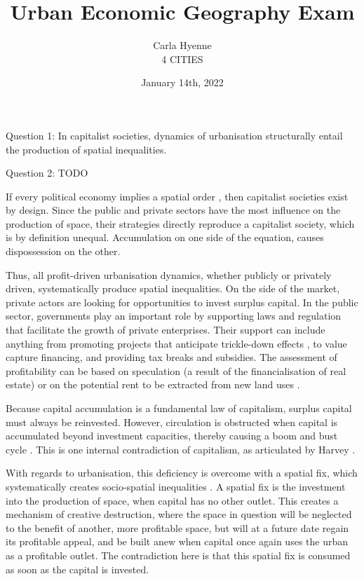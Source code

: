 \documentclass[12pt]{article}
\title{Urban Economic Geography Exam}
\author{Carla Hyenne\\[3ex]4 CITIES}
\date{January 14th, 2022}
\begin{document}
\maketitle

Question 1: In capitalist societies, dynamics of urbanisation structurally entail the production of spatial inequalities.

Question 2: TODO

\pagebreak
\singlespacing

If every political economy implies a spatial order \parencite{Lefebvre}, then capitalist societies exist by design. Since the public and private sectors have the most influence on the production of space, their strategies directly reproduce a capitalist society, which is by definition unequal. Accumulation on one side of the equation, causes dispossession on the other.

Thus, all profit-driven urbanisation dynamics, whether publicly or privately driven, systematically produce spatial inequalities. 
On the side of the market, private actors are looking for opportunities to invest surplus capital. In the public sector, governments play an important role by supporting laws and regulation that facilitate the growth of private enterprises. Their support can include anything from promoting projects that anticipate trickle-down effects \parencite{TODO}, to value capture financing, and providing tax breaks and subsidies.
The assessment of profitability can be based on speculation (a result of the financialisation of real estate) or on the potential rent to be extracted from new land uses \parencite{Neil Smith}.

Because capital accumulation is a fundamental law of capitalism, surplus capital must always be reinvested. However, circulation is obstructed when capital is accumulated beyond investment capacities, thereby causing a boom and bust cycle \parencite{TODO}. This is one internal contradiction of capitalism, as articulated by Harvey \citeyear{TODO}.

With regards to urbanisation, this deficiency is overcome with a spatial fix, which systematically creates socio-spatial inequalities \parencite{Harvey}.
A spatial fix is the investment into the production of space, when capital has no other outlet. 
This creates a mechanism of creative destruction, where the space in question will be neglected to the benefit of another, more profitable space, but will at a future date regain its profitable appeal, and be built anew when capital once again uses the urban as a profitable outlet.
The contradiction here is that this spatial fix is consumed as soon as the capital is invested.
\end{document}
